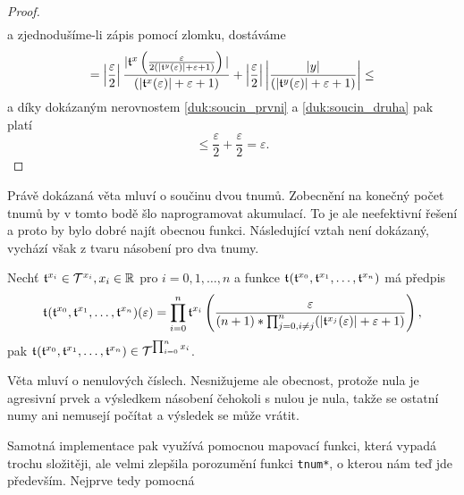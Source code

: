 \begin{theorem}
\begin{proof}
\begin{equation}
\begin{split}
\end{split}
\end{equation}
a zjednodušíme-li zápis pomocí zlomku, dostáváme
\begin{equation}
= \left|\frac{\varepsilon}{2}\right|\frac{|\mathfrak{t}^{x}\left(\frac{\varepsilon}{2(|\mathfrak{t}^{y}(\varepsilon)|+\varepsilon +1)}\right)|}{(|\mathfrak{t}^{x}(\varepsilon)|+\varepsilon +1)}+\left|\frac{\varepsilon}{2}\right|\left|\frac{|y|}{(|\mathfrak{t}^{y}(\varepsilon)|+\varepsilon +1)}\right|\leq
\end{equation}
a díky dokázaným nerovnostem \ref{duk:soucin_prvni} a \ref{duk:soucin_druha} pak platí
\begin{equation}
\leq\frac{\varepsilon}{2}+\frac{\varepsilon}{2}=\varepsilon.
\end{equation}
\end{proof}
\end{theorem}

Právě dokázaná věta mluví o součinu dvou tnumů. Zobecnění na konečný počet tnumů by v tomto bodě šlo naprogramovat akumulací. To je ale neefektivní řešení a proto by bylo dobré najít obecnou funkci. Následující vztah není dokázaný, vychází však z tvaru násobení pro dva tnumy.

\begin{fact}\label{vet:soucin_tnumu}
Nechť $\mathfrak{t}^{x_i}\in\mathcal{T}^{x_i}, x_i\in\mathbb{R}$ pro $i=0,1,\ldots,n$ a funkce $\mathfrak{t}^{}(\mathfrak{t}^{x_0},\mathfrak{t}^{x_1},\ldots,\mathfrak{t}^{x_n})$ má předpis
\begin{equation}
\mathfrak{t}^{}(\mathfrak{t}^{x_0},\mathfrak{t}^{x_1},\ldots,\mathfrak{t}^{x_n})(\varepsilon)=\prod_{i=0}^n\mathfrak{t}^{x_i}\left(\frac{\varepsilon}{(n+1)*\prod_{j=0, i\neq j}^n(|\mathfrak{t}^{x_j}(\varepsilon)|+\varepsilon +1)}\right),
\end{equation}
pak $\mathfrak{t}^{}(\mathfrak{t}^{x_0},\mathfrak{t}^{x_1},\ldots,\mathfrak{t}^{x_n})\in\mathcal{T}^{\prod_{i=0}^nx_i}$.
\end{fact}

Věta mluví o nenulových číslech. Nesnižujeme ale obecnost, protože nula je agresivní prvek a výsledkem násobení čehokoli s nulou je nula, takže se ostatní numy ani nemusejí počítat a výsledek se může vrátit.

Samotná implementace pak využívá pomocnou mapovací funkci, která vypadá trochu složitěji, ale velmi zlepšila porozumění funkci \texttt{tnum*}, o kterou nám teď jde především. Nejprve tedy pomocná

